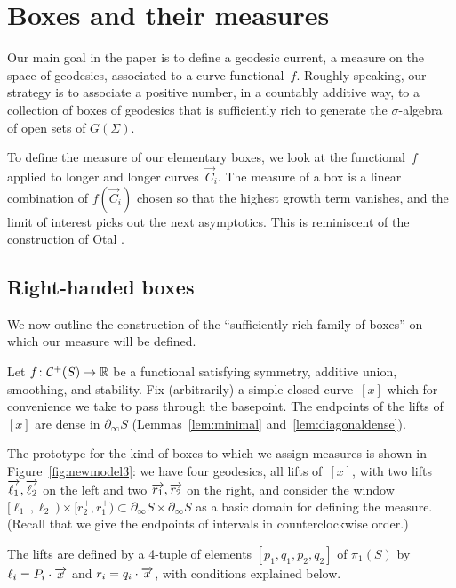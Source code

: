 \section{Boxes and their measures}
\label{sec:define_measure}
Our main goal in the paper is to define a geodesic current, a measure
on the space of geodesics, associated to a curve functional~$f$. 
Roughly speaking, our strategy is to associate a positive number, in a
countably additive way, to a collection of boxes of geodesics that is 
sufficiently rich to generate the $\sigma$-algebra of open sets of
$G(\Sigma)$.

To define the measure of our elementary boxes, we look at the
functional~$f$ applied to longer and longer curves~$\vec C_i$. The
measure of a box is a linear combination of $f(\vec C_i)$ chosen so that
the highest growth term vanishes, and the limit of interest picks out
the next asymptotics. This is reminiscent of the construction of Otal
\cite{Otal90:SpectreMarqueNegative}.

\subsection{Right-handed boxes}
\label{sec:boxes}

We now outline the construction of the ``sufficiently rich family of boxes'' on which our measure will be defined.

Let $f\colon \mathcal{C}^+(S) \to \mathbb{R}$ be a
functional satisfying symmetry, additive union, smoothing, and stability.
Fix
(arbitrarily) a simple closed curve~$[x]$ which for convenience we
take to pass through the basepoint. The endpoints of the lifts of
$[x]$ are dense in
$\partial_\infty S$ (Lemmas~\ref{lem:minimal} and~\ref{lem:diagonaldense}).

The prototype for
the kind of boxes to which we assign measures is shown in
Figure~\ref{fig:newmodel3}: we have four geodesics, all lifts of~$[x]$, with
two lifts $\overrightarrow{\ell_1},\overrightarrow{\ell_2}$ on the left and two $\overrightarrow{r_1},\overrightarrow{r_2}$ on the right,
and consider the window
$[\ell_1^-,\ell_2^-) \times [r_2^+,r_1^+) \subset
\partial_\infty S \times \partial_\infty  S$ as a basic domain
for defining the measure.
(Recall that we give the endpoints of intervals in counterclockwise
order.)

The lifts are defined by a 4-tuple of
elements $[p_1,q_1,p_2,q_2]$ of $\pi_1(S)$ by
$\ell_i = P_i \cdot \overrightarrow{x}$ and $r_i = q_i \cdot \overrightarrow{x}$, with
conditions explained below.

